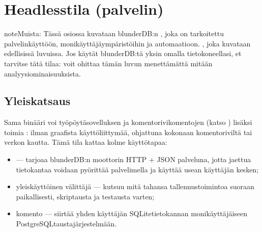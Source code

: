 \documentclass[letterpaper,10pt,finnish]{sphinxmanual}
\begin{document}
\sphinxstepscope


\section{Headless\sphinxhyphen{}tila (palvelin)}
\label{\detokenize{mode_headless:mode-headless-serveur}}\label{\detokenize{mode_headless:headless}}\label{\detokenize{mode_headless::doc}}
\begin{sphinxadmonition}{note}{Muista:}
\sphinxAtStartPar
Tässä osiossa kuvataan blunderDB:n , joka on tarkoitettu palvelinkäyttöön, monikäyttäjäympäristöihin ja automaatioon. , joka kuvataan edellisissä luvuissa. Jos käytät blunderDB:tä yksin omalla tietokoneellasi, et tarvitse tätä tilaa: voit ohittaa tämän luvun menettämättä mitään analyysiominaisuuksista.
\end{sphinxadmonition}


\subsection{Yleiskatsaus}
\label{\detokenize{mode_headless:vue-d-ensemble}}
\sphinxAtStartPar
Sama \sphinxhyphen{}binääri voi työpöytäsovelluksen ja komentorivikomentojen (katso {\hyperref[\detokenize{cli:cli}]{}}) lisäksi toimia : ilman graafista käyttöliittymää, ohjattuna kokonaan komentoriviltä tai verkon kautta. Tämä tila kattaa kolme käyttötapaa:
\begin{itemize}
\item {} 
\sphinxAtStartPar
{}  — tarjoaa blunderDB:n moottorin HTTP + JSON \sphinxhyphen{}palveluna, jotta jaettua tietokantaa voidaan pyörittää palvelimella ja käyttää usean käyttäjän kesken;

\item {} 
\sphinxAtStartPar
yleiskäyttöinen \sphinxhyphen{}välittäjä — kutsuu mitä tahansa tallennustoimintoa suoraan paikallisesti, skriptausta ja testausta varten;

\item {} 
\sphinxAtStartPar
{}\sphinxhyphen{}komento — siirtää yhden käyttäjän SQLite\sphinxhyphen{}tietokannan monikäyttäjäiseen PostgreSQL\sphinxhyphen{}taustajärjestelmään.

\end{itemize}
\end{document}
